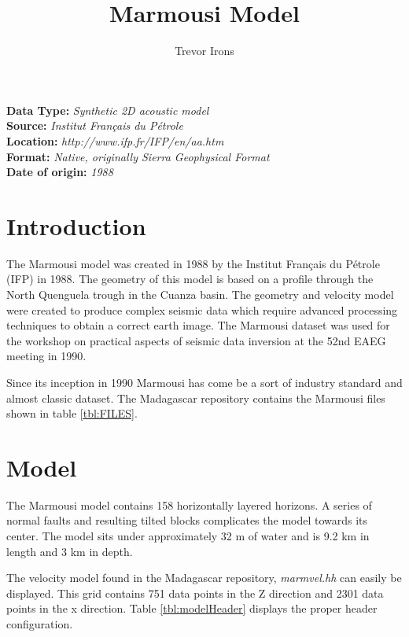 \title{Marmousi Model}
\author{Trevor Irons}
\lstset{language=python,numbers=left,numberstyle=\tiny,showstringspaces=false}

\maketitle
\noindent
\textbf {Data Type:} \emph{Synthetic 2D acoustic model}\\
\textbf {Source:} \emph{Institut Fran\c{c}ais du P\'{e}trole}\\
\textbf {Location:} \emph{http://www.ifp.fr/IFP/en/aa.htm}\\
\textbf {Format:} \emph{Native, originally Sierra Geophysical Format} \\
\textbf{Date of origin:} \emph{1988}\\

\section{Introduction}
The Marmousi model was created in 1988 by the Institut Fran\c{c}ais du P\'{e}trole (IFP) in 1988.  The geometry of this model is based on a 
profile through the North Quenguela trough in the Cuanza basin. The geometry and velocity model were created to produce complex seismic data 
which require advanced processing techniques to obtain a correct earth image. The Marmousi dataset was used for the workshop on practical 
aspects of seismic data inversion at the 52nd EAEG meeting in 1990.

Since its inception in 1990 Marmousi has come be a sort of industry standard and almost classic dataset. The Madagascar repository contains 
the Marmousi files shown in table \ref{tbl:FILES}.

{
\tiny

\normalsize
}

\section{Model}
The Marmousi model contains 158 horizontally layered horizons.  A series of normal faults and resulting tilted blocks complicates the model towards its center.  The model sits under approximately 32 m of water and is 9.2 km in length and 3 km in depth.  

The velocity model found in the Madagascar repository, \emph{marmvel.hh} can easily be displayed.  This grid contains 751 data points in the Z direction and 2301 data points in the x direction.  Table \ref{tbl:modelHeader} displays the proper header configuration.  

